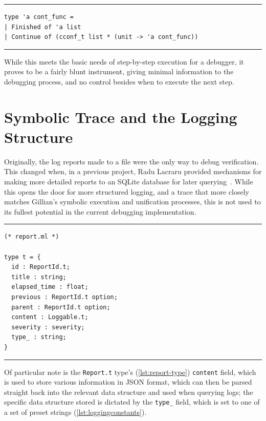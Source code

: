 \begin{listing}[!ht]
\noindent\rule{\textwidth}{0.5pt}
\vspace{-0.6cm}
\begin{verbatim}
type 'a cont_func =
| Finished of 'a list
| Continue of (cconf_t list * (unit -> 'a cont_func))
\end{verbatim}
\vspace{-0.4cm}
\noindent\rule{\textwidth}{0.5pt}
\vspace{-0.6cm}
\caption{The original \texttt{cont\_func} type}
\label{lst:contfunc-type-original}
\end{listing}

While this meets the basic needs of step-by-step execution for a debugger, it
proves to be a fairly blunt instrument, giving minimal information to the
debugging process, and no control besides when to execute the next step.


\section{Symbolic Trace and the Logging Structure}\label{sec:current:trace}

Originally, the log reports made to a file were the only way to debug
verification. This changed when, in a previous project, Radu Lacraru provided
mechanisms for making more detailed reports to an SQLite database for later
querying~\cite{gillian-logging-2020}. While this opens the door for more 
structured logging, and a trace that more closely matches Gillian's symbolic
execution and unification processes, this is not used to its fullest potential
in the current debugging implementation.

\begin{listing}[!ht]
\noindent\rule{\textwidth}{0.5pt}
\vspace{-0.6cm}
\begin{verbatim}
(* report.ml *)

type t = {
  id : ReportId.t;
  title : string;
  elapsed_time : float;
  previous : ReportId.t option;
  parent : ReportId.t option;
  content : Loggable.t;
  severity : severity;
  type_ : string;
}
\end{verbatim}
\vspace{-0.4cm}
\noindent\rule{\textwidth}{0.5pt}
\vspace{-0.6cm}
\caption{The \texttt{Report.t} type}
\label{lst:report-type}
\end{listing}

Of particular note is the \texttt{Report.t} type's (\autoref{lst:report-type})
\texttt{content} field, which is used to store various information in JSON
format, which can then be parsed straight back into the relevant data structure
and used when querying logs; the specific data structure stored is dictated by
the \texttt{type\_} field, which is set to one of a set of preset strings
(\autoref{lst:loggingconstants}).

